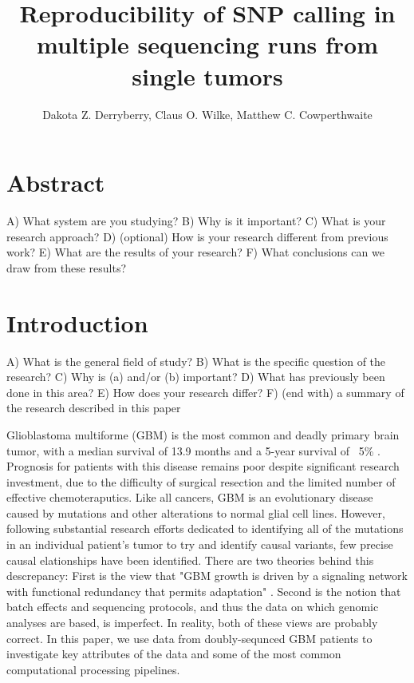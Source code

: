 \documentclass[11pt]{article} %
\title{Reproducibility of SNP calling in multiple sequencing runs from single tumors}
\author{Dakota Z. Derryberry, Claus O. Wilke, Matthew C. Cowperthwaite}
\begin{document}
\maketitle

\section{Abstract}

A) What system are you studying?
B) Why is it important?
C) What is your research approach?
D) (optional) How is your research different from previous work?
E) What are the results of your research?
F) What conclusions can we draw from these results?



\section{Introduction}

A) What is the general field of study?
B) What is the specific question of the research?
C) Why is (a) and/or (b) important?
D) What has previously been done in this area?
E) How does your research differ?
F) (end with) a summary of the research described in this paper

Glioblastoma multiforme (GBM) is the most common and deadly primary brain tumor, with a median survival of 13.9 months and a 5-year survival of ~5\% \cite{TCGA-GBM-13}. Prognosis for patients with this disease remains poor despite significant research investment, due to the difficulty of surgical resection and the limited number of effective chemoteraputics. Like all cancers, GBM is an evolutionary disease caused by mutations and other alterations to normal glial cell lines. However, following substantial research efforts dedicated to identifying all of the mutations in an individual patient's tumor to try and identify causal variants, few precise causal elationships have been identified. There are two theories behind this descrepancy: First is the view that "GBM growth is driven by a signaling network with functional redundancy that permits adaptation" \cite{TCGA-GBM-13}. Second is the notion that batch effects and sequencing protocols, and thus the data on which genomic analyses are based, is imperfect. In reality, both of these views are probably correct. In this paper, we use data from doubly-sequnced GBM patients to investigate key attributes of the data and some of the most common computational processing pipelines.
\end{document}
